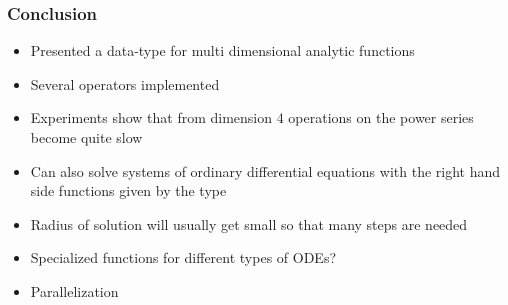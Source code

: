 \documentclass[xcolor=pdftex,dvipsnames,table,handout]{beamer}
\begin{document}
\begin{frame}
  \frametitle{Conclusion}
  \begin{itemize}[<+->]
  \item Presented a data-type for multi dimensional analytic functions
  \item Several operators implemented
  \item Experiments show that from dimension $4$ operations on the power series become quite slow
  \item Can also solve systems of ordinary differential equations with the right hand side functions given by the type
  \item Radius of solution will usually get small so that many steps are needed
  \item Specialized functions for different types of ODEs?
  \item Parallelization
  \end{itemize}
  \end{frame}
%
\end{document}
